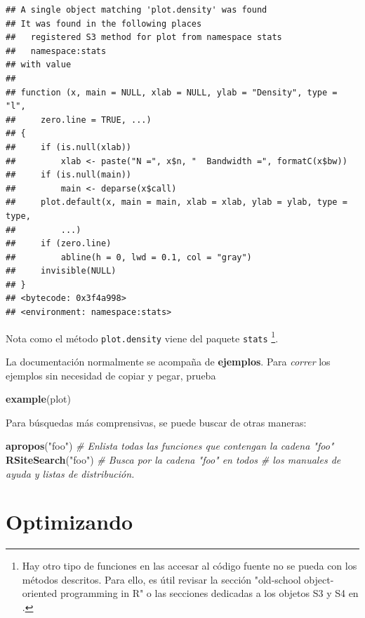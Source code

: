 \documentclass[]{article}
\newenvironment{Shaded}{\begin{snugshade}}{\end{snugshade}}
\newcommand{\KeywordTok}[1]{\textcolor[rgb]{0.13,0.29,0.53}{\textbf{#1}}}
\newcommand{\StringTok}[1]{\textcolor[rgb]{0.31,0.60,0.02}{#1}}
\newcommand{\CommentTok}[1]{\textcolor[rgb]{0.56,0.35,0.01}{\textit{#1}}}
\newcommand{\NormalTok}[1]{#1}
\let\rmarkdownfootnote\footnote%
\def\footnote{\protect\rmarkdownfootnote}
\begin{document}
\begin{verbatim}
## A single object matching 'plot.density' was found
## It was found in the following places
##   registered S3 method for plot from namespace stats
##   namespace:stats
## with value
## 
## function (x, main = NULL, xlab = NULL, ylab = "Density", type = "l", 
##     zero.line = TRUE, ...) 
## {
##     if (is.null(xlab)) 
##         xlab <- paste("N =", x$n, "  Bandwidth =", formatC(x$bw))
##     if (is.null(main)) 
##         main <- deparse(x$call)
##     plot.default(x, main = main, xlab = xlab, ylab = ylab, type = type, 
##         ...)
##     if (zero.line) 
##         abline(h = 0, lwd = 0.1, col = "gray")
##     invisible(NULL)
## }
## <bytecode: 0x3f4a998>
## <environment: namespace:stats>
\end{verbatim}

Nota como el método \texttt{plot.density} viene del paquete
\texttt{stats}
\footnote{Hay otro tipo de funciones en las accesar al código fuente no se pueda con los métodos descritos. Para ello, es útil revisar la sección "old-school object-oriented programming in R" \parencite[][p.131-133]{adler2010r} o las secciones dedicadas a los objetos S3 y S4 en \textcite{wickham2014advanced}.}.

La documentación normalmente se acompaña de \textbf{ejemplos}. Para
\emph{correr} los ejemplos sin necesidad de copiar y pegar, prueba

\begin{Shaded}
\begin{Highlighting}[]
\KeywordTok{example}\NormalTok{(plot)}
\end{Highlighting}
\end{Shaded}

Para búsquedas más comprensivas, se puede buscar de otras maneras:

\begin{Shaded}
\begin{Highlighting}[]
\KeywordTok{apropos}\NormalTok{(}\StringTok{"foo"}\NormalTok{) }\CommentTok{# Enlista todas las funciones que contengan la cadena "foo"}
\KeywordTok{RSiteSearch}\NormalTok{(}\StringTok{"foo"}\NormalTok{) }\CommentTok{# Busca por la cadena "foo" en todos }
\CommentTok{# los manuales de ayuda y listas de distribución.}
\end{Highlighting}
\end{Shaded}

\section{Optimizando}\label{optimizando}
\end{document}
